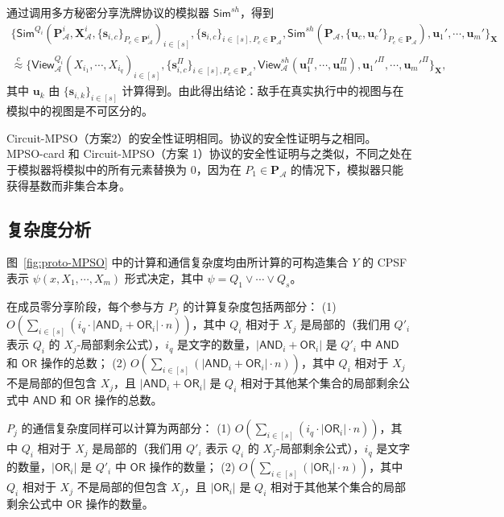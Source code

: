 \begin{trivlist}
通过调用多方秘密分享洗牌协议的模拟器 $\mathsf{Sim}^{sh}$，得到
\begin{gather*}
\{\mathsf{Sim}^{Q_i}(\textbf{P}^i_{\mathcal{A}},\textbf{X}^i_{\mathcal{A}},\{\textbf{s}_{i, c}\}_{P_c \in \textbf{P}^i_{\mathcal{A}}})_{i \in [s]}, \{\textbf{s}_{i, c}\}_{i \in [s], P_c \in \textbf{P}_{\mathcal{A}}}, \mathsf{Sim}^{sh}(\textbf{P}_{\mathcal{A}},\{\textbf{u}_c,\textbf{u}_c'\}_{P_c \in \textbf{P}_{\mathcal{A}}}), \textbf{u}_{1}', \cdots,\textbf{u}_{m}'\}_\textbf{X} \\
\overset{c}{\approx} \{\mathsf{View}_{\mathcal{A}}^{Q_i}(X_{i_1},\cdots,X_{i_q})_{i \in [s]},\{\textbf{s}^{\Pi}_{i, c}\}_{i \in [s], P_c \in \textbf{P}_{\mathcal{A}}}, \mathsf{View}_{\mathcal{A}}^{sh}(\textbf{u}_{1}^{\Pi},\cdots,\textbf{u}_{m}^{\Pi}),\textbf{u}_{1}'^{\Pi},\cdots,\textbf{u}_{m}'^{\Pi}\}_\textbf{X},
\end{gather*}
其中 $\textbf{u}_k$ 由 $\{\textbf{s}_{i, k}\}_{i \in [s]}$ 计算得到。由此得出结论：敌手在真实执行中的视图与在模拟中的视图是不可区分的。

Circuit-MPSO（方案2）的安全性证明相同。协议的安全性证明与之相同。MPSO-card 和 Circuit-MPSO（方案 1）协议的安全性证明与之类似，不同之处在于模拟器将模拟中的所有元素替换为 0，因为在 $P_1 \in \textbf{P}_{\mathcal{A}}$ 的情况下，模拟器只能获得基数而非集合本身。
\end{trivlist}

\subsection{复杂度分析}

图~\ref{fig:proto-MPSO} 中的计算和通信复杂度均由所计算的可构造集合 $Y$ 的 CPSF 表示 $\psi(x, X_1, \cdots, X_m)$ 形式决定，其中 $\psi = Q_1 \lor \cdots \lor Q_s$。

在成员零分享阶段，每个参与方 $P_j$ 的计算复杂度包括两部分：
(1) $O(\sum_{i \in [s]}(i_q \cdot \lvert \mathsf{AND}_i + \mathsf{OR}_i \rvert \cdot n))$，其中 $Q_i$ 相对于 $X_j$ 是局部的（我们用 $Q'_i$ 表示 $Q_i$ 的 $X_j$-局部剩余公式），$i_q$ 是文字的数量，$\lvert \mathsf{AND}_i + \mathsf{OR}_i \rvert$ 是 $Q'_i$ 中 $\mathsf{AND}$ 和 $\mathsf{OR}$ 操作的总数；
(2) $O(\sum_{i \in [s]}(\lvert \mathsf{AND}_i + \mathsf{OR}_i \rvert \cdot n))$，其中 $Q_i$ 相对于 $X_j$ 不是局部的但包含 $X_j$，且 $\lvert \mathsf{AND}_i + \mathsf{OR}_i \rvert$ 是 $Q_i$ 相对于其他某个集合的局部剩余公式中 $\mathsf{AND}$ 和 $\mathsf{OR}$ 操作的总数。

$P_j$ 的通信复杂度同样可以计算为两部分：
(1) $O(\sum_{i \in [s]}(i_q \cdot \lvert \mathsf{OR}_i \rvert \cdot n))$，其中 $Q_i$ 相对于 $X_j$ 是局部的（我们用 $Q'_i$ 表示 $Q_i$ 的 $X_j$-局部剩余公式），$i_q$ 是文字的数量，$\lvert \mathsf{OR}_i \rvert$ 是 $Q'_i$ 中 $\mathsf{OR}$ 操作的数量；
(2) $O(\sum_{i \in [s]}(\lvert \mathsf{OR}_i \rvert \cdot n))$，其中 $Q_i$ 相对于 $X_j$ 不是局部的但包含 $X_j$，且 $\lvert \mathsf{OR}_i \rvert$ 是 $Q_i$ 相对于其他某个集合的局部剩余公式中 $\mathsf{OR}$ 操作的数量。

